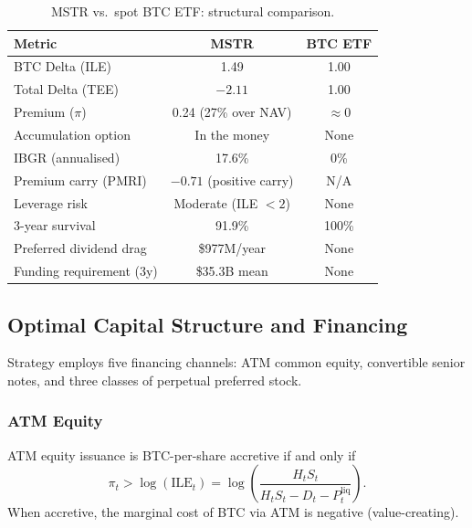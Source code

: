 \begin{table}[H]
\centering
\caption{MSTR vs.\ spot BTC ETF: structural comparison.}
\label{tab:mstr-vs-etf}
\begin{tabular}{@{}lcc@{}}
\toprule
\textbf{Metric} & \textbf{MSTR} & \textbf{BTC ETF} \\
\midrule
BTC Delta (ILE) & 1.49 & 1.00 \\
Total Delta (TEE) & $-2.11$ & 1.00 \\
Premium ($\pi$) & 0.24 (27\% over NAV) & $\approx 0$ \\
Accumulation option & In the money & None \\
IBGR (annualised) & 17.6\% & 0\% \\
Premium carry (PMRI) & $-0.71$ (positive carry) & N/A \\
Leverage risk & Moderate (ILE $< 2$) & None \\
3-year survival & 91.9\% & 100\% \\
Preferred dividend drag & \$977M/year & None \\
Funding requirement (3y) & \$35.3B mean & None \\
\bottomrule
\end{tabular}
\end{table}

\subsection{Optimal Capital Structure and Financing}\label{sec:optimal_capital}

Strategy employs five financing channels: ATM common equity, convertible
senior notes, and three classes of perpetual preferred stock.

\subsubsection{ATM Equity}

\begin{proposition}\label{prop:atm_threshold}
  ATM equity issuance is BTC-per-share accretive if and only if
  \begin{equation}
    \label{eq:atm_accretive}
    \pi_t > \log(\mathrm{ILE}_t)
    = \log\!\left(\frac{H_t S_t}{H_t S_t - D_t - P_t^{\mathrm{liq}}}\right).
  \end{equation}
  When accretive, the marginal cost of BTC via ATM is negative (value-creating).
\end{proposition}

